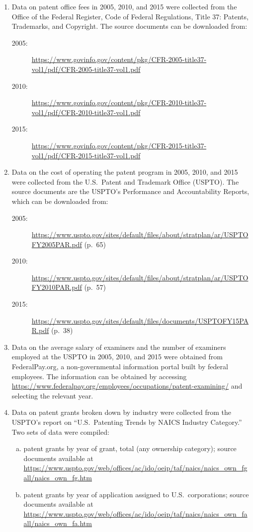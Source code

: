 \documentclass[a4paper,11pt]{article}
\begin{document}
\begin{enumerate}[(1)]
\item \label{s:fees} Data on patent office fees in 2005, 2010, and 2015 were collected from the Office of the Federal Register, Code of Federal Regulations, Title 37: Patents, Trademarks, and Copyright. The source documents can be downloaded from:
\begin{description}
  \item[2005:] \url{https://www.govinfo.gov/content/pkg/CFR-2005-title37-vol1/pdf/CFR-2005-title37-vol1.pdf}
  \item[2010:] \url{https://www.govinfo.gov/content/pkg/CFR-2010-title37-vol1/pdf/CFR-2010-title37-vol1.pdf}
  \item[2015:] \url{https://www.govinfo.gov/content/pkg/CFR-2015-title37-vol1/pdf/CFR-2015-title37-vol1.pdf}
\end{description}

\item \label{s:budget} Data on the cost of operating the patent program in 2005, 2010, and 2015 were collected from the U.S.~Patent and Trademark Office (USPTO). The source documents are the USPTO's Performance and Accountability Reports, which can be downloaded from:
\begin{description}
  \item[2005:] \url{https://www.uspto.gov/sites/default/files/about/stratplan/ar/USPTOFY2005PAR.pdf} (p.~65)
  \item[2010:] \url{https://www.uspto.gov/sites/default/files/about/stratplan/ar/USPTOFY2010PAR.pdf} (p.~57)
  \item[2015:] \url{https://www.uspto.gov/sites/default/files/documents/USPTOFY15PAR.pdf} (p.~38)
\end{description}

\item \label{s:exsal} Data on the average salary of examiners and the number of examiners employed at the USPTO in 2005, 2010, and 2015 were obtained from FederalPay.org, a non-governmental information portal built by federal employees. The information can be obtained by accessing \url{https://www.federalpay.org/employees/occupations/patent-examining/} and selecting the relevant year.

\item \label{s:fc} Data on patent grants broken down by industry were collected from the USPTO's report on ``U.S.~Patenting Trends by NAICS Industry Category.'' Two sets of data were compiled:
\begin{enumerate}[(a)]
  \item patent grants by year of grant, total (any ownership category); source documents available at \url{https://www.uspto.gov/web/offices/ac/ido/oeip/taf/naics/naics_own_fgall/naics_own_fg.htm}
  \item patent grants by year of application assigned to U.S.~corporations; source documents available at \url{https://www.uspto.gov/web/offices/ac/ido/oeip/taf/naics/naics_own_faall/naics_own_fa.htm}
\end{enumerate}


\end{enumerate}
\end{document}
